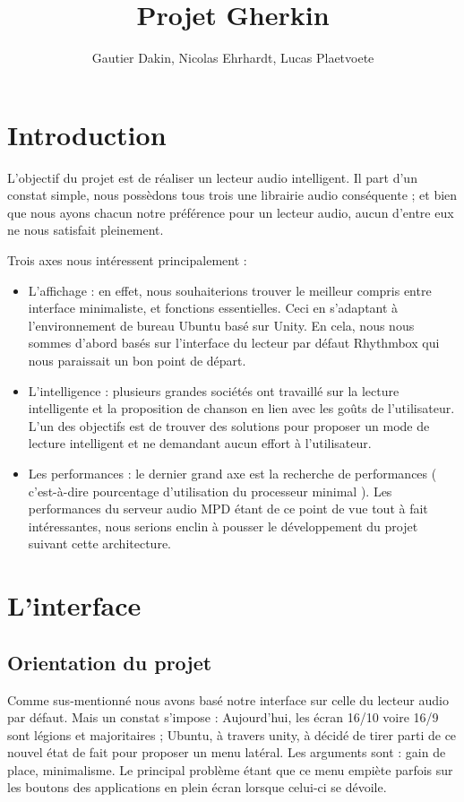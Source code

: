 \documentclass{report}
\author{Gautier Dakin, Nicolas Ehrhardt, Lucas Plaetvoete}
\title{Projet Gherkin}
\begin{document}
\maketitle

\section*{Introduction}
L'objectif du projet est de réaliser un lecteur audio intelligent. Il part d'un constat simple, nous possèdons tous trois une librairie audio conséquente ; et bien que nous ayons chacun notre préférence pour un lecteur audio, aucun d'entre eux ne nous satisfait pleinement.

Trois axes nous intéressent principalement :
\begin{itemize}
\item L'affichage : en effet, nous souhaiterions trouver le meilleur compris entre interface minimaliste, et fonctions essentielles. Ceci en s'adaptant à l'environnement de bureau Ubuntu basé sur Unity. En cela, nous nous sommes d'abord basés sur l'interface du lecteur par défaut Rhythmbox qui nous paraissait un bon point de départ.

\item L'intelligence : plusieurs grandes sociétés ont travaillé sur la lecture intelligente et la proposition de chanson en lien avec les goûts de l'utilisateur. L'un des objectifs est de trouver des solutions pour proposer un mode de lecture intelligent et ne demandant aucun effort à l'utilisateur.

\item Les performances : le dernier grand axe est la recherche de performances ( c'est-à-dire pourcentage d'utilisation du processeur minimal ). Les performances du serveur audio MPD étant de ce point de vue tout à fait intéressantes, nous serions enclin à pousser le développement du projet suivant cette architecture.
\end{itemize}

\section*{L'interface}
\subsection*{Orientation du projet}
Comme sus-mentionné nous avons basé notre interface sur celle du lecteur audio par défaut. Mais un constat s'impose : Aujourd'hui, les écran 16/10 voire 16/9 sont légions et majoritaires ; Ubuntu, à travers unity, à décidé de tirer parti de ce nouvel état de fait pour proposer un menu latéral. Les arguments sont : gain de place, minimalisme. Le principal problème étant que ce menu empiète parfois sur les boutons des applications en plein écran lorsque celui-ci se dévoile.
\end{document}
